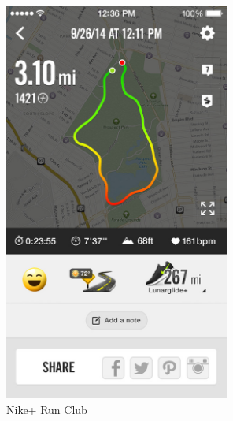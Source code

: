 \documentclass[12pt,a4paper]{article}
\renewcommand\texttt[1]{{\ttfamily\color{textttColor}#1}}
\begin{document}
            \begin{figure}
                \centering
                \begin{minipage}{.5\textwidth}
                    \includegraphics[width=0.66\textwidth]{1-3-2}
                    \centering
                    \caption{Nike\texttt{+} Run Club}
                    \label{fig:nike-plus-run-club}
                \end{minipage}%
                \begin{minipage}{.5\textwidth}

\end{minipage}
\end{figure}
\end{document}
